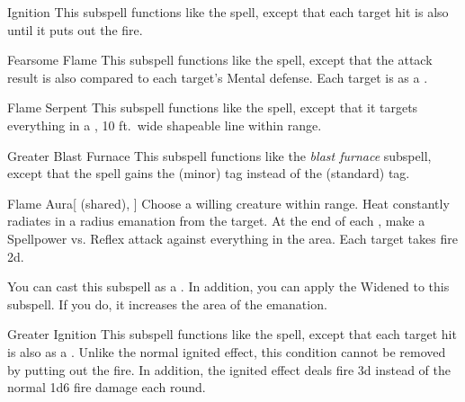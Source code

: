 \begin{ability}[\nth{3}]{Ignition}
This subspell functions like the  spell, except that each target hit is also  until it puts out the fire.
\end{ability}
\vspace{0.25em}


\begin{ability}[\nth{4}]{Fearsome Flame}
This subspell functions like the  spell, except that the attack result is also compared to each target's Mental defense.
\hit Each target is  as a .
\end{ability}
\vspace{0.25em}


\begin{ability}[\nth{4}]{Flame Serpent}
This subspell functions like the  spell, except that it targets everything in a \arealarge, 10 ft.\ wide shapeable line within \rngmed range.
\end{ability}
\vspace{0.25em}


\begin{ability}[\nth{5}]{Greater Blast Furnace}
This subspell functions like the \textit{blast furnace} subspell, except that the spell gains the  (minor) tag instead of the  (standard) tag.
\end{ability}
\vspace{0.25em}


\begin{ability}[\nth{6}]{Flame Aura}[ (shared), ]
Choose a willing creature within \rngclose range.
Heat constantly radiates in a \areamed radius emanation from the target.
At the end of each , make a Spellpower vs. Reflex attack against everything in the area.
\hit Each target takes fire  \minus2d.

You can cast this subspell as a .
In addition, you can apply the Widened  to this subspell.
If you do, it increases the area of the emanation.
\end{ability}
\vspace{0.25em}


\begin{ability}[\nth{6}]{Greater Ignition}
This subspell functions like the  spell, except that each target hit is also  as a .
Unlike the normal ignited effect, this condition cannot be removed by putting out the fire.
In addition, the ignited effect deals fire  \minus3d instead of the normal 1d6 fire damage each round.
\end{ability}
\vspace{0.25em}


